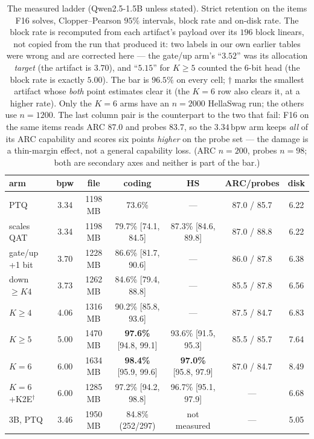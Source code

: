 \documentclass[11pt,a4paper]{article}
\newcommand{\bpw}{\,\mathrm{bpw}}
\begin{document}
\begin{table}[t]
\centering\small\setlength{\tabcolsep}{4pt}
\caption{The measured ladder (Qwen2.5-1.5B unless stated). Strict retention on the items F16
solves, Clopper--Pearson $95\%$ intervals, block rate and on-disk rate. The block rate is
recomputed from each artifact's payload over its $196$ block linears, not copied from the run that
produced it: two labels in our own earlier tables were wrong and are corrected here --- the gate/up
arm's ``$3.52$'' was its allocation \emph{target} (the artifact is $3.70$), and ``$5.15$'' for
$K\ge5$ counted the 6-bit head (the block rate is exactly $5.00$). The bar is $96.5\%$ on every
cell; $\dagger$ marks the smallest artifact whose \emph{both} point estimates clear it (the $K{=}6$ row also
clears it, at a higher rate). Only the $K{=}6$ arms have an $n{=}2000$ HellaSwag run; the others use $n{=}1200$. The last
column pair is the counterpart to the two that fail: F16 on the same items reads ARC $87.0$ and
probes $83.7$, so the $3.34\bpw$ arm keeps \emph{all} of its ARC capability and scores six points
\emph{higher} on the probe set --- the damage is a thin-margin effect, not a general capability
loss. (ARC $n=200$, probes $n=98$; both are secondary axes and neither is part of the bar.)}
\label{tab:ladder}
\begin{tabular}{lcccccc}
\toprule
arm & bpw & file & coding & HS & ARC/probes & disk\\
\midrule
PTQ                & 3.34 & 1198 MB & 73.6\% & --- & 87.0 / 85.7 & 6.22\\
scales QAT         & 3.34 & 1198 MB & 79.7\% [74.1, 84.5] & 87.3\% [84.6, 89.8] & 87.0 / 88.8 & 6.22\\
gate/up +1 bit     & 3.70 & 1228 MB & 86.6\% [81.7, 90.6] & --- & 86.0 / 87.8 & 6.38\\
down $\ge K4$      & 3.73 & 1262 MB & 84.6\% [79.4, 88.8] & --- & 85.5 / 87.8 & 6.56\\
$K\ge4$            & 4.06 & 1316 MB & 90.2\% [85.8, 93.6] & --- & 87.5 / 84.7 & 6.83\\
$K\ge5$            & 5.00 & 1470 MB & \textbf{97.6\%} [94.8, 99.1] & 93.6\% [91.5, 95.3] & 85.5 / 85.7 & 7.64\\
$K=6$              & 6.00 & 1634 MB & \textbf{98.4\%} [95.9, 99.6] & \textbf{97.0\%} [95.8, 97.9] & 87.0 / 84.7 & 8.49\\
$K=6$+K2E$^\dagger$ & 6.00 & 1285 MB & 97.2\% [94.2, 98.8] & 96.7\% [95.1, 97.9] & --- & 6.68\\
\midrule
3B, PTQ            & 3.46 & 1950 MB & 84.8\% (252/297) & not measured & --- & 5.05\\
\bottomrule
\end{tabular}
\end{table}
\end{document}
